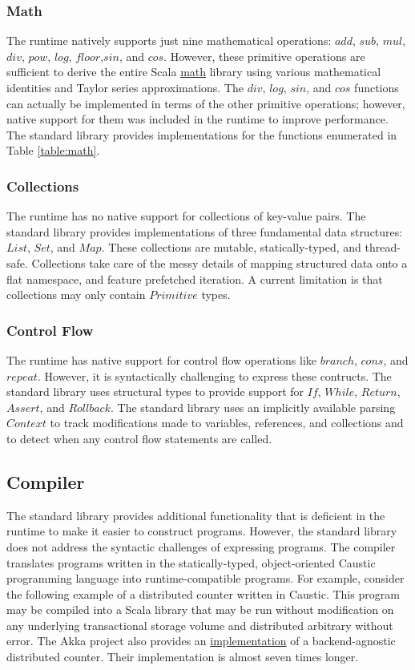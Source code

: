 \documentclass[12pt]{article}
\begin{document}
\subsubsection{Math}
The runtime natively supports just nine mathematical operations: $add$, $sub$, $mul$, $div$, $pow$,
$log$, $floor$,$sin$, and $cos$. However, these primitive operations are sufficient to derive the
entire Scala \href{https://www.scala-lang.org/api/2.12.1/scala/math/index.html}{math} library using
various mathematical identities and Taylor series approximations. The $div$, $log$, $sin$, and $cos$
functions can actually be implemented in terms of the other primitive operations; however, native
support for them was included in the runtime to improve performance. The standard library provides
implementations for the functions enumerated in Table \ref{table:math}.

\subsubsection{Collections}
The runtime has no native support for collections of key-value pairs. The standard library
provides implementations of three fundamental data structures: $List$, $Set$, and $Map$. These
collections are mutable, statically-typed, and thread-safe. Collections take care of the messy
details of mapping structured data onto a flat namespace, and feature prefetched iteration. A
current limitation is that collections may only contain $Primitive$ types.

\subsubsection{Control Flow}
The runtime has native support for control flow operations like $branch$, $cons$, and $repeat$.
However, it is syntactically challenging to express these contructs. The standard library
uses structural types to provide support for $If$, $While$, $Return$, $Assert$, and $Rollback$.
The standard library uses an implicitly available parsing $Context$ to track modifications made
to variables, references, and collections and to detect when any control flow statements are
called.

\subsection{Compiler}
The standard library provides additional functionality that is deficient in the runtime to make it
easier to construct programs. However, the standard library does not address the syntactic
challenges of expressing programs. The compiler translates programs written in the
statically-typed, object-oriented Caustic programming language into runtime-compatible programs.
For example, consider the following example of a distributed counter written in Caustic. This
program may be compiled into a Scala library that may be run without modification on any
underlying transactional storage volume and distributed arbitrary without error. The Akka project
also provides an \href{https://git.io/vxS6u}{implementation} of a backend-agnostic distributed
counter. Their implementation is almost seven times longer.
\end{document}
